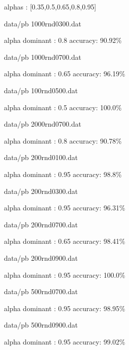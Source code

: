 alphas : [0.35,0.5,0.65,0.8,0.95]

data/pb 1000rnd0300.dat

alpha dominant : 0.8
accuracy: 90.92\%

  data/pb 1000rnd0700.dat

alpha dominant : 0.65
accuracy: 96.19\%

  data/pb 100rnd0500.dat

alpha dominant : 0.5
accuracy: 100.0\%

  data/pb 2000rnd0700.dat

alpha dominant : 0.8
accuracy: 90.78\%

  data/pb 200rnd0100.dat

alpha dominant : 0.95
accuracy: 98.8\%

  data/pb 200rnd0300.dat

alpha dominant : 0.95
accuracy: 96.31\%

  data/pb 200rnd0700.dat

alpha dominant : 0.65
accuracy: 98.41\%

  data/pb 200rnd0900.dat

alpha dominant : 0.95
accuracy: 100.0\%

  data/pb 500rnd0700.dat

alpha dominant : 0.95
accuracy: 98.95\%

  data/pb 500rnd0900.dat

alpha dominant : 0.95
accuracy: 99.02\%
